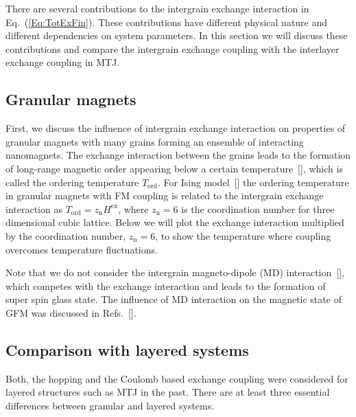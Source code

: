 \documentclass[aps,prb,amsmath,amssymb,twocolumn,superscriptaddress,showpacs,floatfix]{revtex4-1}
\begin{document}
There are several contributions to the intergrain exchange interaction
in Eq.~(\ref{Eq:TotExFin}). These contributions have different physical nature
and different dependencies on system parameters. In this section we
will discuss these contributions and compare
the intergrain exchange coupling with the interlayer exchange
coupling in MTJ.




\subsection{Granular magnets}


First, we discuss the influence of intergrain exchange interaction
on properties of granular magnets with many grains forming an
ensemble of interacting nanomagnets. The exchange interaction between the
grains leads to the formation of long-range magnetic order appearing below
a certain temperature~[],
which is called the ordering temperature $T_\mathrm{ord}$.
For Ising model~[] the ordering temperature in
granular magnets with FM coupling is related to the intergrain exchange interaction as $T_\mathrm{ord}=z_\mathrm n H^\mathrm{ex}$, where $z_\mathrm n =6$ is the coordination number for three dimensional cubic lattice.
Below we will plot the exchange interaction multiplied by the
coordination number, $z_\mathrm n=6$, to show the
temperature where coupling overcomes temperature fluctuations.

Note that we do not consider the intergrain
magneto-dipole (MD) interaction~[], which competes with the exchange interaction and leads to the
formation of super spin glass state. The influence of MD interaction on the magnetic
state of GFM was discussed in Refs.~[].



\subsection{Comparison with layered systems}


Both, the hopping and the Coulomb based exchange coupling were considered
for layered structures such as MTJ in the past.
There are at least three essential differences between granular and layered systems.
\end{document}

